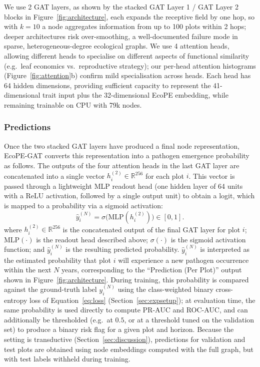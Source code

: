 \documentclass[a4paper,fleqn]{cas-sc}
\begin{document}
\begin{itemize}[leftmargin=1.4em]
We use 2 GAT layers, as shown by the stacked GAT Layer 1 / GAT Layer 2 blocks in Figure~\ref{fig:architecture}, each expands the receptive field by one hop, so with $k=10$ a node aggregates information from up to 100 plots within 2 hops; deeper architectures risk over-smoothing, a well-documented failure mode in sparse, heterogeneous-degree ecological graphs. We use 4 attention heads, allowing different heads to specialise on different aspects of functional similarity (e.g.\ leaf economics vs.\ reproductive strategy); our per-head attention histograms (Figure~\ref{fig:attention}b) confirm mild specialisation across heads. Each head has 64 hidden dimensions, providing sufficient capacity to represent the 41-dimensional trait input plus the 32-dimensional EcoPE embedding, while remaining trainable on CPU with 79k nodes.

\end{itemize}

\subsubsection{Predictions}
\label{sec:predictions}

Once the two stacked GAT layers have produced a final node representation, EcoPE-GAT converts this representation into a pathogen emergence probability as follows. The outputs of the four attention heads in the last GAT layer are concatenated into a single vector $h_i^{(2)} \in \mathbb{R}^{256}$ for each plot $i$. This vector is passed through a lightweight MLP readout head (one hidden layer of 64 units with a ReLU activation, followed by a single output unit) to obtain a logit, which is mapped to a probability via a sigmoid activation:
\begin{equation}
\hat{y}_i^{(N)} = \sigma\big(\text{MLP}(h_i^{(2)})\big) \in [0,1].
\end{equation}
where $h_i^{(2)} \in \mathbb{R}^{256}$ is the concatenated output of the final GAT layer for plot $i$; $\text{MLP}(\cdot)$ is the readout head described above; $\sigma(\cdot)$ is the sigmoid activation function; and $\hat{y}_i^{(N)}$ is the resulting predicted probability. $\hat{y}_i^{(N)}$ is interpreted as the estimated probability that plot $i$ will experience a new pathogen occurrence within the next $N$ years, corresponding to the ``Prediction (Per Plot)'' output shown in Figure~\ref{fig:architecture}. During training, this probability is compared against the ground-truth label $y_i^{(N)}$ using the class-weighted binary cross-entropy loss of Equation~\eqref{eq:loss} (Section~\ref{sec:expsetup}); at evaluation time, the same probability is used directly to compute PR-AUC and ROC-AUC, and can additionally be thresholded (e.g.\ at $0.5$, or at a threshold tuned on the validation set) to produce a binary risk flag for a given plot and horizon. Because the setting is transductive (Section~\ref{sec:discussion}), predictions for validation and test plots are obtained using node embeddings computed with the full graph, but with test labels withheld during training.
\end{document}
